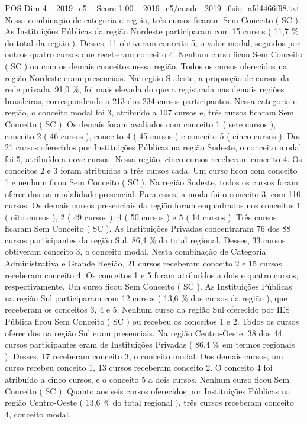 \begin{textsample}{POS Dim 4 – 2019\_c5 – Score 1.00 – 2019\_c5/enade\_2019\_fisio\_afd4466f98.txt}
Nessa combinação de categoria e região, três cursos ficaram Sem Conceito ( SC ).
As Instituições Públicas da região Nordeste participaram com 15 cursos ( 11,7 \% do total da região ).
Desses, 11 obtiveram conceito 5, o valor modal, seguidos por outros quatro cursos que receberam conceito 4.
Nenhum curso ficou Sem Conceito ( SC ) ou com os demais conceitos nessa região.
Todos os cursos oferecidos na região Nordeste eram presenciais.
Na região Sudeste, a proporção de cursos da rede privada, 91,0 \%, foi mais elevada do que a registrada nas demais regiões brasileiras, correspondendo a 213 dos 234 cursos participantes.
Nessa categoria e região, o conceito modal foi 3, atribuído a 107 cursos e, três cursos ficaram Sem Conceito ( SC ).
Os demais foram avaliados com conceito 1 ( sete cursos ), conceito 2 ( 46 cursos ), conceito 4 ( 45 cursos ) e conceito 5 ( cinco cursos ).
Dos 21 cursos oferecidos por Instituições Públicas na região Sudeste, o conceito modal foi 5, atribuído a nove cursos.
Nessa região, cinco cursos receberam conceito 4.
Os conceitos 2 e 3 foram atribuídos a três cursos cada.
Um curso ficou com conceito 1 e nenhum ficou Sem Conceito ( SC ).
Na região Sudeste, todos os cursos foram oferecidos na modalidade presencial.
Para esses, a moda foi o conceito 3, com 110 cursos.
Os demais cursos presenciais da região foram enquadrados nos conceitos 1 ( oito cursos ), 2 ( 49 cursos ), 4 ( 50 cursos ) e 5 ( 14 cursos ).
Três cursos ficaram Sem Conceito ( SC ).
As Instituições Privadas concentraram 76 dos 88 cursos participantes da região Sul, 86,4 \% do total regional.
Desses, 33 cursos obtiveram conceito 3, o conceito modal.
Nesta combinação de Categoria Administrativa e Grande Região, 21 cursos receberam conceito 2 e 15 cursos receberam conceito 4.
Os conceitos 1 e 5 foram atribuídos a dois e quatro cursos, respectivamente.
Um curso ficou Sem Conceito ( SC ).
As Instituições Públicas na região Sul participaram com 12 cursos ( 13,6 \% dos cursos da região ), que receberam os conceitos 3, 4 e 5.
Nenhum curso da região Sul oferecido por IES Pública ficou Sem Conceito ( SC ) ou recebeu os conceitos 1 e 2.
Todos os cursos oferecidos na região Sul eram presenciais.
Na região Centro-Oeste, 38 dos 44 cursos participantes eram de Instituições Privadas ( 86,4 \% em termos regionais ).
Desses, 17 receberam conceito 3, o conceito modal.
Dos demais cursos, um curso recebeu conceito 1, 13 cursos receberam conceito 2.
O conceito 4 foi atribuído a cinco cursos, e o conceito 5 a dois cursos.
Nenhum curso ficou Sem Conceito ( SC ).
Quanto aos seis cursos oferecidos por Instituições Públicas na região Centro-Oeste ( 13,6 \% do total regional ), três cursos receberam conceito 4, conceito modal.

\end{textsample}
